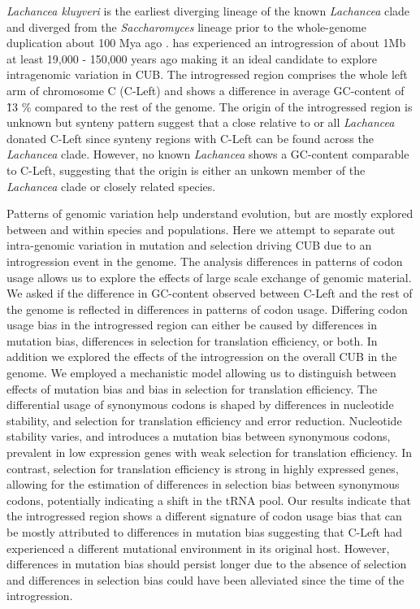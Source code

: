 \documentclass[12pt]{article}
\begin{document}
\textit{Lachancea kluyveri} is the earliest diverging lineage of the known \textit{Lachancea} clade and diverged from the \textit{Saccharomyces} lineage prior to the whole-genome duplication about 100 Mya ago \citep{wolfe1997}. 
\kluyveri has experienced an introgression of about 1Mb at least 19,000 - 150,000 years ago \citep{friedrich2015} making it an ideal candidate to explore intragenomic variation in CUB. 
The introgressed region comprises the whole left arm of chromosome C (C-Left) and shows a difference in average GC-content of \~ 13 \% compared to the rest of the \kluyveri genome.
The origin of the introgressed region is unknown but synteny pattern suggest that a close relative to \kluyveri or all \textit{Lachancea} donated C-Left \citep{payen2009} since synteny regions with C-Left can be found across the \textit{Lachancea} clade.
However, no known \textit{Lachancea} shows a GC-content comparable to C-Left, suggesting that the origin is either an unkown member of the \textit{Lachancea} clade or closely related species.

Patterns of genomic variation help understand evolution, but are mostly explored between and within species and populations.
Here we attempt to separate out intra-genomic variation in mutation and selection driving CUB due to an introgression event in the \kluyveri genome.
The analysis differences in patterns of codon usage allows us to explore the effects of large scale exchange of genomic material. 
We asked if the difference in GC-content observed between C-Left and the rest of the genome is reflected in differences in patterns of codon usage.
Differing codon usage bias in the introgressed region can either be caused by differences in mutation bias, differences in selection for translation efficiency, or both.
In addition we explored the effects of the introgression on the overall CUB in the \kluyveri genome.
We employed a mechanistic model \citep{gilchrist2015} allowing us to distinguish between effects of mutation bias and bias in selection for translation efficiency.
The differential usage of synonymous codons is shaped by differences in nucleotide stability, and selection for translation efficiency and error reduction.
Nucleotide stability varies, and introduces a mutation bias between synonymous codons, prevalent in low expression genes with weak selection for translation efficiency.
In contrast, selection for translation efficiency is strong in highly expressed genes, allowing for the estimation of differences in selection bias between synonymous codons, potentially indicating a shift in the tRNA pool.
Our results indicate that the introgressed region shows a different signature of codon usage bias that can be mostly attributed to differences in mutation bias suggesting that C-Left had experienced a different mutational environment in its original host.
However, differences in mutation bias should persist longer due to the absence of selection and differences in selection bias could have been alleviated since the time of the introgression.   
	
\end{document}
